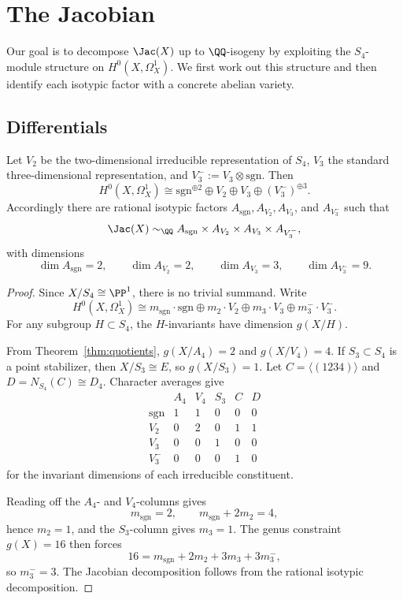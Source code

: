 \section{The Jacobian}

Our goal is to decompose \(\Jac(X)\) up to \(\QQ\)-isogeny by exploiting the \(S_4\)-module structure on \(H^0(X,\Omega_X^1)\). We first work out this structure and then identify each isotypic factor with a concrete abelian variety.

\subsection{Differentials}

\begin{theorem}\label{thm:hodge}
Let \(V_2\) be the two-dimensional irreducible representation of \(S_4\), \(V_3\) the standard three-dimensional representation, and \(V_3^-:=V_3\otimes\mathrm{sgn}\).
Then
\[
H^0(X,\Omega_X^1)\cong \mathrm{sgn}^{\oplus 2}\oplus V_2\oplus V_3\oplus (V_3^-)^{\oplus 3}.
\]
Accordingly there are rational isotypic factors \(A_{\mathrm{sgn}}, A_{V_2}, A_{V_3}\), and \(A_{V_3^-}\) such that
\[
\Jac(X)\sim_{\QQ}A_{\mathrm{sgn}}\times A_{V_2}\times A_{V_3}\times A_{V_3^-},
\]
with dimensions
\[
\dim A_{\mathrm{sgn}}=2,\qquad \dim A_{V_2}=2,\qquad \dim A_{V_3}=3,\qquad \dim A_{V_3^-}=9.
\]
\end{theorem}

\begin{proof}
Since \(X/S_4\cong \PP^1\), there is no trivial summand. Write
\[
H^0(X,\Omega_X^1)\cong m_{\mathrm{sgn}}\cdot \mathrm{sgn}\oplus m_2\cdot V_2\oplus m_3\cdot V_3\oplus m_3^-\cdot V_3^-.
\]
For any subgroup \(H\subset S_4\), the \(H\)-invariants have dimension \(g(X/H)\).

From Theorem~\ref{thm:quotients}, \(g(X/A_4)=2\) and \(g(X/V_4)=4\). If \(S_3\subset S_4\) is a point stabilizer, then \(X/S_3\cong E\), so \(g(X/S_3)=1\). Let \(C=\langle(1234)\rangle\) and \(D=N_{S_4}(C)\cong D_4\). Character averages give
\[
\begin{array}{c|ccccc}
 & A_4 & V_4 & S_3 & C & D\\ \hline
\mathrm{sgn} & 1 & 1 & 0 & 0 & 0\\
V_2 & 0 & 2 & 0 & 1 & 1\\
V_3 & 0 & 0 & 1 & 0 & 0\\
V_3^- & 0 & 0 & 0 & 1 & 0
\end{array}
\]
for the invariant dimensions of each irreducible constituent.

Reading off the \(A_4\)- and \(V_4\)-columns gives
\[
m_{\mathrm{sgn}}=2,\qquad m_{\mathrm{sgn}}+2m_2=4,
\]
hence \(m_2=1\), and the \(S_3\)-column gives \(m_3=1\). The genus constraint \(g(X)=16\) then forces
\[
16=m_{\mathrm{sgn}}+2m_2+3m_3+3m_3^-,
\]
so \(m_3^-=3\). The Jacobian decomposition follows from the rational isotypic decomposition.
\end{proof}

